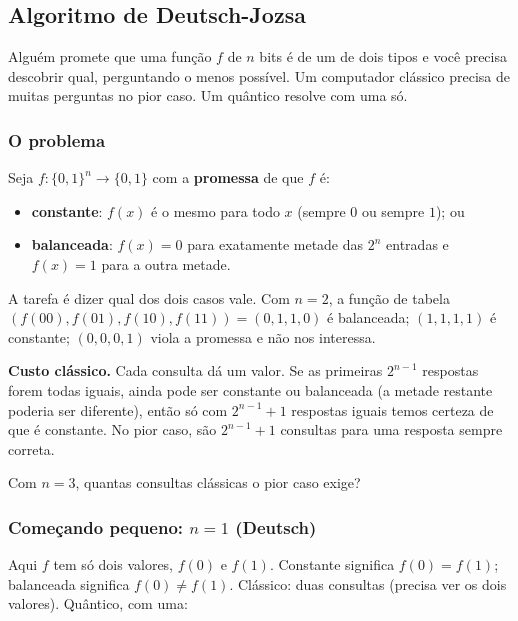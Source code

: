 \subsection{Algoritmo de Deutsch-Jozsa}
Alguém promete que uma função \(f\) de \(n\) bits é de um de dois tipos e você precisa descobrir qual, perguntando o menos possível. Um computador clássico precisa de muitas perguntas no pior caso. Um quântico resolve com uma só.

\subsubsection{O problema}\label{o-problema}

Seja \(f:\{0,1\}^n\to\{0,1\}\) com a \textbf{promessa} de que \(f\) é:

\begin{itemize}
\tightlist
\item
  \textbf{constante}: \(f(x)\) é o mesmo para todo \(x\) (sempre \(0\) ou sempre \(1\)); ou
\item
  \textbf{balanceada}: \(f(x)=0\) para exatamente metade das \(2^n\) entradas e \(f(x)=1\) para a outra metade.
\end{itemize}

A tarefa é dizer qual dos dois casos vale. Com \(n=2\), a função de tabela \((f(00),f(01),f(10),f(11))=(0,1,1,0)\) é balanceada; \((1,1,1,1)\) é constante; \((0,0,0,1)\) viola a promessa e não nos interessa.

\textbf{Custo clássico.} Cada consulta dá um valor. Se as primeiras \(2^{n-1}\) respostas forem todas iguais, ainda pode ser constante ou balanceada (a metade restante poderia ser diferente), então só com \(2^{n-1}+1\) respostas iguais temos certeza de que é constante. No pior caso, são \(2^{n-1}+1\) consultas para uma resposta sempre correta.

Com \(n=3\), quantas consultas clássicas o pior caso exige?

\subsubsection{\texorpdfstring{Começando pequeno: \(n=1\) (Deutsch)}{Começando pequeno: n=1 (Deutsch)}}\label{comeuxe7ando-pequeno-n1-deutsch}

Aqui \(f\) tem só dois valores, \(f(0)\) e \(f(1)\). Constante significa \(f(0)=f(1)\); balanceada significa \(f(0)\neq f(1)\). Clássico: duas consultas (precisa ver os dois valores). Quântico, com uma:


